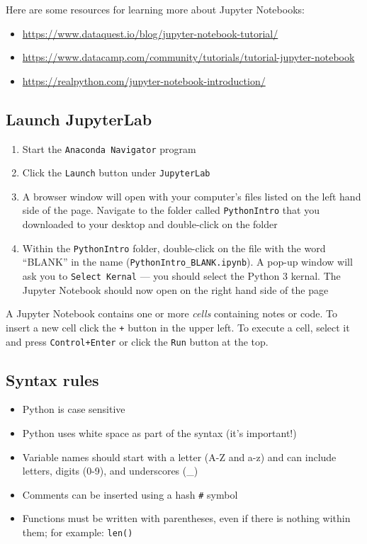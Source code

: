 \documentclass[
]{book}
\providecommand{\tightlist}{%
  \setlength{\itemsep}{0pt}\setlength{\parskip}{0pt}}
\begin{document}
Here are some resources for learning more about Jupyter Notebooks:

\begin{itemize}
\tightlist
\item
  \url{https://www.dataquest.io/blog/jupyter-notebook-tutorial/}
\item
  \url{https://www.datacamp.com/community/tutorials/tutorial-jupyter-notebook}
\item
  \url{https://realpython.com/jupyter-notebook-introduction/}
\end{itemize}

\hypertarget{launch-jupyterlab-1}{%
\subsection{Launch JupyterLab}\label{launch-jupyterlab-1}}

\begin{enumerate}
\def\labelenumi{\arabic{enumi}.}
\tightlist
\item
  Start the \texttt{Anaconda\ Navigator} program
\item
  Click the \texttt{Launch} button under \texttt{JupyterLab}
\item
  A browser window will open with your computer's files listed on the left hand side of the page. Navigate to the folder called \texttt{PythonIntro} that you downloaded to your desktop and double-click on the folder
\item
  Within the \texttt{PythonIntro} folder, double-click on the file with the word ``BLANK'' in the name (\texttt{PythonIntro\_BLANK.ipynb}). A pop-up window will ask you to \texttt{Select\ Kernal} --- you should select the Python 3 kernal. The Jupyter Notebook should now open on the right hand side of the page
\end{enumerate}

A Jupyter Notebook contains one or more \emph{cells} containing notes or code. To insert a new cell click the \texttt{+} button in the upper left. To execute a cell, select it and press \texttt{Control+Enter} or click the \texttt{Run} button at the top.

\hypertarget{syntax-rules-1}{%
\subsection{Syntax rules}\label{syntax-rules-1}}

\begin{itemize}
\tightlist
\item
  Python is case sensitive
\item
  Python uses white space as part of the syntax (it's important!)
\item
  Variable names should start with a letter (A-Z and a-z)
  and can include letters, digits (0-9), and underscores (\_)
\item
  Comments can be inserted using a hash \texttt{\#} symbol
\item
  Functions must be written with parentheses, even
  if there is nothing within them; for example: \texttt{len()}
\end{itemize}
\end{document}
